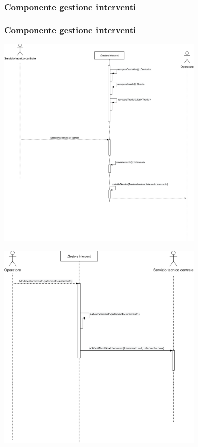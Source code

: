 \documentclass{beamer}
\begin{document}
\begin{frame}[allowframebreaks]
	\subsubsection{Componente gestione interventi}
	\frametitle{Componente gestione interventi}
	\begin{center}
		\includegraphics[width=0.75\textwidth, height=0.75\textheight, keepaspectratio=true]{gestione_interventi_1.png}
	\end{center}
	\pagebreak
		\begin{center}
		\includegraphics[width=0.75\textwidth, height=0.75\textheight, keepaspectratio=true]{gestione_interventi_2.png}
	\end{center}
\end{frame}
\end{document}
